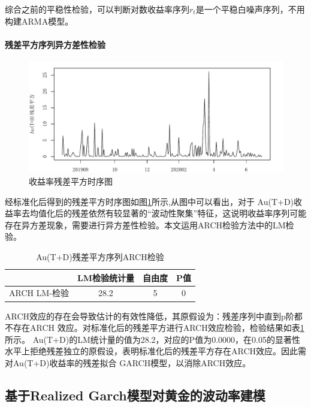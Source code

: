 \documentclass[UTF8,a4paper,12pt]{ctexart}  %
\begin{document}
综合之前的平稳性检验，可以判断对数收益率序列\(r_t\)是一个平稳白噪声序列，不用构建ARMA模型。

\hypertarget{section-16}{%
\paragraph{残差平方序列异方差性检验}\label{section-16}}

\begin{figure}[H]

{\centering \includegraphics[width=0.95\linewidth]{03-estimation-lytfinal_files/figure-latex/resi2-1} 

}

\caption{收益率残差平方时序图}\label{fig:resi2}
\end{figure}

经标准化后得到的残差平方时序图如图\ref{fig:resi2}所示,从图中可以看出，对于
Au(T+D)收益率去均值化后的残差依然有较显著的``波动性聚集''特征，这说明收益率序列可能存在异方差现象，需要进行异方差性检验。本文运用ARCH检验方法中的LM检验。

\begin{longtable}[t]{lccc}
\caption{\label{tab:Au-ARCH}Au(T+D)残差平方序列ARCH检验}\\
\toprule
  & LM检验统计量 & 自由度 & P值\\
\midrule
ARCH LM-检验 & 28.2 & 5 & 0\\
\bottomrule
\end{longtable}

ARCH效应的存在会导致估计的有效性降低，其原假设为：残差序列中直到p阶都不存在ARCH
效应。对标准化后的残差平方进行ARCH效应检验，检验结果如表\ref{tab:Au-ARCH}所示。
Au(T+D)的LM统计量的值为28.2，对应的P值为0.0000，在0.05的显著性水平上拒绝残差独立的原假设，表明标准化后的残差平方存在ARCH效应。因此需对Au(T+D)收益率的残差拟合
GARCH模型，以消除ARCH效应。

\hypertarget{realized-garch-4}{%
\subsection{基于Realized Garch模型对黄金的波动率建模}\label{realized-garch-4}}
\end{document}
